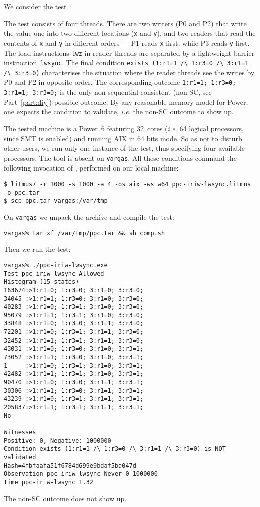 We consider the test~:

The test consists of four threads.
There are  two writers (P0 and P2) that write the value
one into two different locations (\texttt{x} and \texttt{y}),
and two readers that read the contents of \texttt{x} and \texttt{y}
in different orders --- P1 reads \texttt{x} first, while P3 reads
\texttt{y} first.
The load instructions \texttt{lwz} in reader threads are separated
by a lightweight barrier instruction~\texttt{lwsync}.
The final condition \verb+exists (1:r1=1 /\ 1:r3=0 /\ 3:r1=1 /\ 3:r3=0)+
characterises the situation where the reader threads see the writes
by P0 and P2 in opposite order.
The corresponding outcome  \verb+1:r1=1; 1:r3=0; 3:r1=1; 3:r3=0;+
is the only non-sequential consistent (non-SC, see Part~\ref{part:diy}) possible outcome.
By any reasonable memory model for Power,
one expects the condition to validate,
\emph{i.e.} the non-SC outcome to show up.

The tested machine
is a Power~6 featuring 32~cores (\emph{i.e.}
64 logical processors, since SMT is enabled) and running AIX in 64 bits mode.
So as not to disturb other users, we run only one instance of the test,
thus specifying four available processors.
The \litmus{} tool is absent on \texttt{vargas}.
All these conditions command the following invocation of \litmus{},
performed on our local machine:
\begin{verbatim}
$ litmus7 -r 1000 -s 1000 -a 4 -os aix -ws w64 ppc-iriw-lwsync.litmus -o ppc.tar
$ scp ppc.tar vargas:/var/tmp
\end{verbatim}
On \texttt{vargas} we unpack the archive and compile the test:
\begin{verbatim}
vargas% tar xf /var/tmp/ppc.tar && sh comp.sh
\end{verbatim}
Then we run the test:
\begin{verbatim}
vargas% ./ppc-iriw-lwsync.exe
Test ppc-iriw-lwsync Allowed
Histogram (15 states)
163674:>1:r1=0; 1:r3=0; 3:r1=0; 3:r3=0;
34045 :>1:r1=1; 1:r3=0; 3:r1=0; 3:r3=0;
40283 :>1:r1=0; 1:r3=1; 3:r1=0; 3:r3=0;
95079 :>1:r1=1; 1:r3=1; 3:r1=0; 3:r3=0;
33848 :>1:r1=0; 1:r3=0; 3:r1=1; 3:r3=0;
72201 :>1:r1=0; 1:r3=1; 3:r1=1; 3:r3=0;
32452 :>1:r1=1; 1:r3=1; 3:r1=1; 3:r3=0;
43031 :>1:r1=0; 1:r3=0; 3:r1=0; 3:r3=1;
73052 :>1:r1=1; 1:r3=0; 3:r1=0; 3:r3=1;
1     :>1:r1=0; 1:r3=1; 3:r1=0; 3:r3=1;
42482 :>1:r1=1; 1:r3=1; 3:r1=0; 3:r3=1;
90470 :>1:r1=0; 1:r3=0; 3:r1=1; 3:r3=1;
30306 :>1:r1=1; 1:r3=0; 3:r1=1; 3:r3=1;
43239 :>1:r1=0; 1:r3=1; 3:r1=1; 3:r3=1;
205837:>1:r1=1; 1:r3=1; 3:r1=1; 3:r3=1;
No

Witnesses
Positive: 0, Negative: 1000000
Condition exists (1:r1=1 /\ 1:r3=0 /\ 3:r1=1 /\ 3:r3=0) is NOT validated
Hash=4fbfaafa51f6784d699e9bdaf5ba047d
Observation ppc-iriw-lwsync Never 0 1000000
Time ppc-iriw-lwsync 1.32
\end{verbatim}
The non-SC outcome does not show up.

